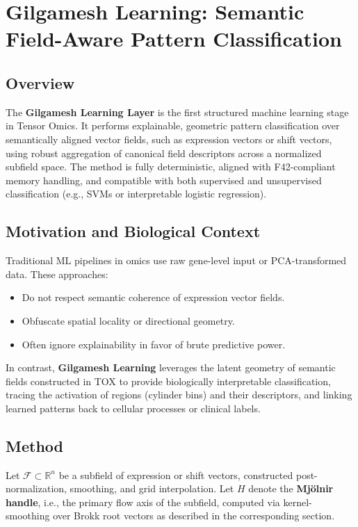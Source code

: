\section{Gilgamesh Learning: Semantic Field-Aware Pattern Classification}

    \subsection{Overview}

        The \textbf{Gilgamesh Learning Layer} is the first structured machine learning stage in Tensor Omics. It performs explainable, geometric pattern classification over semantically aligned vector fields, such as expression vectors or shift vectors, using robust aggregation of canonical field descriptors across a normalized subfield space. The method is fully deterministic, aligned with F42-compliant memory handling, and compatible with both supervised and unsupervised classification (e.g., SVMs or interpretable logistic regression).

    \subsection{Motivation and Biological Context}

        Traditional ML pipelines in omics use raw gene-level input or PCA-transformed data. These approaches:
        \begin{itemize}
            \item Do not respect semantic coherence of expression vector fields.
            \item Obfuscate spatial locality or directional geometry.
            \item Often ignore explainability in favor of brute predictive power.
        \end{itemize}

        In contrast, \textbf{Gilgamesh Learning} leverages the latent geometry of semantic fields constructed in TOX to provide biologically interpretable classification, tracing the activation of regions (cylinder bins) and their descriptors, and linking learned patterns back to cellular processes or clinical labels.

    \subsection{Method}

        Let $\mathcal{F} \subset \mathbb{R}^n$ be a subfield of expression or shift vectors, constructed post-normalization, smoothing, and grid interpolation. Let $H$ denote the \textbf{Mj\"olnir handle}, i.e., the primary flow axis of the subfield, computed via kernel-smoothing over Brokk root vectors as described in the corresponding section.

